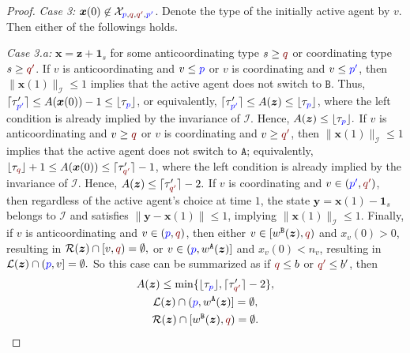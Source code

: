 \documentclass[10 pt,twocolumn,journal]{IEEEtran}
\DeclarePairedDelimiter{\ceil}{\lceil}{\rceil}
\DeclarePairedDelimiter{\floor}{\lfloor}{\rfloor}
\theoremstyle{plain}
\newcommand{\A}{\mathcal{A}}
\newcommand{\I}{\mathcal{I}}
\newcommand{\X}{\mathcal{X}}
\newcommand{\R}{\mathcal{R}}
\renewcommand{\L}{\mathcal{L}}
\newcommand{\x}{\bm{x}}
\newcommand{\y}{\bm{y}}
\newcommand{\z}{\bm{z}}
\newcommand{\p}{\tb{p}}
\newcommand{\pp}{\tb{p'}}
\newcommand{\q}{\tr{q}}
\newcommand{\qq}{\tr{q'}}
\renewcommand{\A}{\mathtt{A}}
\newcommand{\B}{\mathtt{B}}
\newcommand{\tb}{\textcolor{blue}}
\newcommand{\tr}{\textcolor{Myred}}
\theoremstyle{definition}
\begin{document}
\begin{proof}
\emph{Case 3:} $\x(0) \not\in \X_{\p,\q,\qq ,\pp }$. 
Denote the type of the initially active agent by $v$.
Then either of the followings holds.

\emph{Case 3.a:} 
$\x = \z + \bm{1}_s$ for some anticoordinating type $s\geq \q$ or coordinating type $s\geq\qq$.  
If $v$ is anticoordinating and $v\leq\p$ or $v$ is coordinating and $v\leq\pp$, then $\|\x(1)\|_{\I} \leq1$ implies that the active agent does not switch to $\B$.
Thus, $\ceil{\tau'_{\pp }} \leq A(\x(0))-1 \leq \floor{\tau_{\p}}$, or equivalently, $\ceil{\tau'_{\pp }} \leq A(\z) \leq \floor{\tau_{\p}}$, where the left condition is already implied by the invariance of $\I$.
Hence, 
$
    A(\z) \leq \floor{\tau_{\p}}.
$    
If $v$ is anticoordinating and $v\geq\q$ or $v$ is coordinating and $v\geq\qq$, then $\|\x(1)\|_{\I} \leq1$ implies that the active agent does not switch to $\A$; equivalently, $\floor{\tau_{\q}}+1 \leq A(\x(0))\leq \ceil{\tau'_{\qq }}-1$, where the left condition is already implied by the invariance of $\I$.
Hence, 
$    
    A(\z)\leq \ceil{\tau'_{\qq }}-2.    
$    
If $v$ is coordinating and $v\in(\pp,\qq)$, then regardless of the active agent's choice at time $1$, the state $\y=\x(1)-\bm{1}_s$ belongs to $\I$ and satisfies $\|\y-\x(1)\|\leq1$, implying $\|\x(1)\|_{\I} \leq 1$.
Finally, if $v$ is anticoordinating and $v\in(\p,\q)$, then either 
$v\in[w^{\B}(\z),\q)$ and $x_v(0)>0$, resulting in 
$
    \R(\z)\cap[v,\q) = \emptyset,
$    
or $v\in(\p,w^{\A}(\z)]$ and $x_v(0) <n_v$, resulting in 
$
    \L(\z)\cap(\p,v] = \emptyset.
$    
So this case can be summarized as
if $\q\leq b$ or $\qq\leq b'$, then
\begin{gather}    
    A(\z) \leq \min\{\floor{\tau_{\p}},\ceil{\tau'_{\qq }}-2\}, \label{stabilityTheorem_eq36} \\
    \L(\z)\cap(\p,w^{\A}(\z)] = \emptyset, \label{stabilityTheorem_eq37} \\
    \R(\z)\cap[w^{\B}(\z),\q) = \emptyset. \label{stabilityTheorem_eq37} 
\end{gather}


\end{proof}
\end{document}
